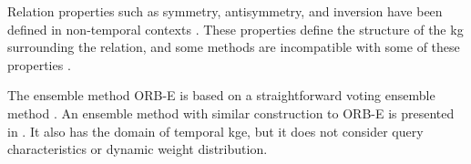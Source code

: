 Relation properties such as symmetry, antisymmetry, and inversion have been defined in non-temporal contexts \cite{schmidt10relationalmathematics}.
These properties define the structure of the \gls{kg} surrounding the relation, and some methods are incompatible with some of these properties \cite{chami2020atth, gregucci23sepa}.

The ensemble method ORB-E is based on a straightforward voting ensemble method \cite{MOHAMMED2023757}.
An ensemble method with similar construction to ORB-E is presented in \cite{otte2022towards}. It also has the domain of temporal \gls{kge}, but it does not consider query characteristics or dynamic weight distribution. 

